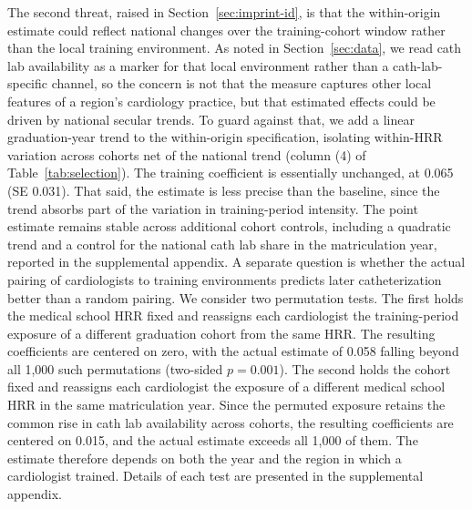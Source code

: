 \documentclass[12pt]{article}
\begin{document}
The second threat, raised in Section~\ref{sec:imprint-id}, is that the within-origin estimate could reflect national changes over the training-cohort window rather than the local training environment. As noted in Section~\ref{sec:data}, we read cath lab availability as a marker for that local environment rather than a cath-lab-specific channel, so the concern is not that the measure captures other local features of a region's cardiology practice, but that estimated effects could be driven by national secular trends. To guard against that, we add a linear graduation-year trend to the within-origin specification, isolating within-HRR variation across cohorts net of the national trend (column (4) of Table~\ref{tab:selection}). The training coefficient is essentially unchanged, at 0.065 (SE 0.031). That said, the estimate is less precise than the baseline, since the trend absorbs part of the variation in training-period intensity. The point estimate remains stable across additional cohort controls, including a quadratic trend and a control for the national cath lab share in the matriculation year, reported in the supplemental appendix. A separate question is whether the actual pairing of cardiologists to training environments predicts later catheterization better than a random pairing. We consider two permutation tests. The first holds the medical school HRR fixed and reassigns each cardiologist the training-period exposure of a different graduation cohort from the same HRR. The resulting coefficients are centered on zero, with the actual estimate of 0.058 falling beyond all 1,000 such permutations (two-sided $p = 0.001$). The second holds the cohort fixed and reassigns each cardiologist the exposure of a different medical school HRR in the same matriculation year. Since the permuted exposure retains the common rise in cath lab availability across cohorts, the resulting coefficients are centered on 0.015, and the actual estimate exceeds all 1,000 of them. The estimate therefore depends on both the year and the region in which a cardiologist trained. Details of each test are presented in the supplemental appendix.
\end{document}

